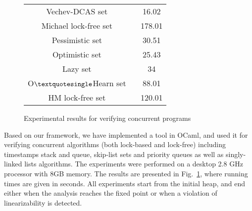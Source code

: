 \begin{figure}[]
\begin{tabular}{|c | c | }
\textsf{Vechev-DCAS set  ~\cite{Vechev:list}}   & \textsf{16.02}  \\

\textsf{Michael lock-free set ~\cite{Michael:list}}  & \textsf{178.01}  \\

\textsf{Pessimistic set  ~\cite{ArtOfMpP}}&\textsf{30.51} \\

\textsf{Optimistic set ~\cite{ArtOfMpP}}& \textsf{25.43} \\

\textsf{Lazy set ~\cite{Lazyset}  }  & \textsf {34} \\

\textsf {O$\textquotesingle $Hearn set  ~\cite{OHearnlist}}     & \textsf{88.01} \\

\textsf{HM lock-free set  ~\cite{ArtOfMpP} } & \textsf{120.01} \\
\hline
\end{tabular}

\caption{Experimental results for verifying concurrent programs}
\label{Experiments:fig}
\end{figure}
Based on our framework, we have implemented a tool in OCaml, and used
it for
verifying concurrent algorithms (both lock-based and lock-free)
including timestamps stack and queue, skip-list sets and priority queues as well as singly-linked lists algorithms. 
The experiments were performed on a desktop 2.8 GHz processor with 8GB memory. The results are presented in Fig.~\ref{Experiments:fig},
where running times are given in seconds. 
All experiments start from the initial heap,  
and end either when the analysis reaches the fixed point or when a violation of linearizability is detected. 

%




